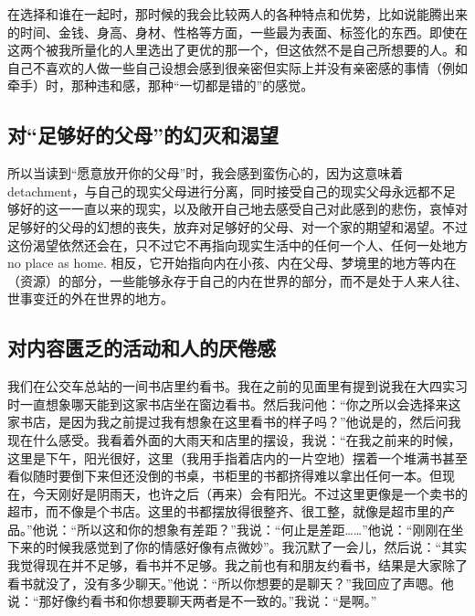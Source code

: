 在选择和谁在一起时，那时候的我会比较两人的各种特点和优势，比如说能腾出来的时间、金钱、身高、身材、性格等方面，一些最为表面、标签化的东西。即使在这两个被我所量化的人里选出了更优的那一个，但这依然不是自己所想要的人。和自己不喜欢的人做一些自己设想会感到很亲密但实际上并没有亲密感的事情（例如牵手）时，那种违和感，那种“一切都是错的”的感觉。







\subsection*{对“足够好的父母”的幻灭和渴望}

所以当读到“愿意放开你的父母”时，我会感到蛮伤心的，因为这意味着detachment，与自己的现实父母进行分离，同时接受自己的现实父母永远都不足够好的这一一直以来的现实，以及敞开自己地去感受自己对此感到的悲伤，哀悼对足够好的父母的幻想的丧失，放弃对足够好的父母、对一个家的期望和渴望。不过这份渴望依然还会在，只不过它不再指向现实生活中的任何一个人、任何一处地方\pozhehao{}no place as home. 相反，它开始指向内在小孩、内在父母、梦境里的地方等内在（资源）的部分，一些能够永存于自己的内在世界的部分，而不是处于人来人往、世事变迁的外在世界的地方。







\subsection*{对内容匮乏的活动和人的厌倦感}

我们在公交车总站的一间书店里约看书。我在之前的见面里有提到说我在大四实习时一直想象哪天能到这家书店坐在窗边看书。然后我问他：“你之所以会选择来这家书店，是因为我之前提过我有想象在这里看书的样子吗？”他说是的，然后问我现在什么感受。我看着外面的大雨天和店里的摆设，我说：“在我之前来的时候，这里是下午，阳光很好，这里（我用手指着店内的一片空地）摆着一个堆满书甚至看似随时要倒下来但还没倒的书桌，书柜里的书都挤得难以拿出任何一本。但现在，今天刚好是阴雨天，也许之后（再来）会有阳光。不过这里更像是一个卖书的超市，而不像是个书店。这里的书都摆放得很整齐、很工整，就像是超市里的产品。”他说：“所以这和你的想象有差距？”我说：“何止是差距……”他说：“刚刚在坐下来的时候我感觉到了你的情感好像有点微妙”。我沉默了一会儿，然后说：“其实我觉得现在并不足够，看书并不足够。我之前也有和朋友约看书，结果是大家除了看书就没了，没有多少聊天。”他说：“所以你想要的是聊天？”我回应了声嗯。他说：“那好像约看书和你想要聊天两者是不一致的。”我说：“是啊。”

